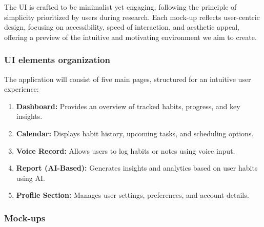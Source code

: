 \documentclass{article}
\begin{document}
The UI is crafted to be minimalist yet engaging, following the principle of simplicity prioritized by users during research.
Each mock-up reflects user-centric design, focusing on accessibility, speed of interaction, and aesthetic appeal, offering a preview of the intuitive and motivating environment we aim to create.

\subsubsection{UI elements organization}

The application will consist of five main pages, structured for an intuitive user experience:

\begin{enumerate}
    \item \textbf{Dashboard:} Provides an overview of tracked habits, progress, and key insights.
    \item \textbf{Calendar:} Displays habit history, upcoming tasks, and scheduling options.
    \item \textbf{Voice Record:} Allows users to log habits or notes using voice input.
    \item \textbf{Report (AI-Based):} Generates insights and analytics based on user habits using AI.
    \item \textbf{Profile Section:} Manages user settings, preferences, and account details.
\end{enumerate}

\subsubsection{Mock-ups}


\end{document}
